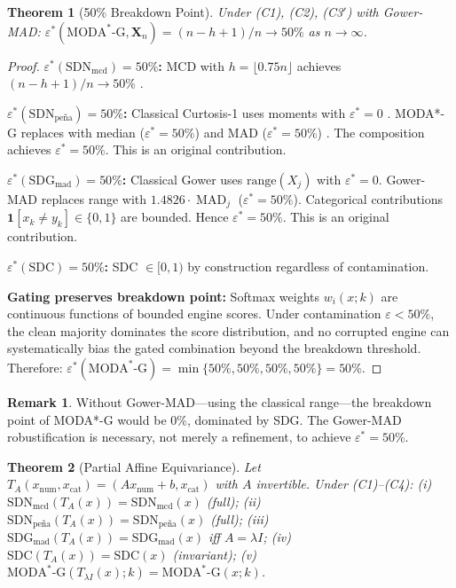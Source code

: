 \documentclass[11pt]{article}
\theoremstyle{plain}
\newtheorem{theorem}{Theorem}
\theoremstyle{definition}
\newtheorem{remark}{Remark}
\DeclareMathOperator{\MAD}{MAD}
\newcommand{\moda}{\text{MODA}^*\text{-G}}
\begin{document}
\begin{theorem}[50\% Breakdown Point]
\label{thm:breakdown}
Under (C1), (C2), (C3$'$) with Gower-MAD:
$\varepsilon^*(\moda, \mathbf{X}_n) =
(n-h+1)/n \to 50\%$ as $n \to \infty$.
\end{theorem}

\begin{proof}
\textbf{$\varepsilon^*(\text{SDN}_\text{mcd}) = 50\%$:}
MCD with $h = \lfloor 0.75n \rfloor$ achieves
$(n-h+1)/n \to 50\%$ \citep{rousseeuw1985}.

\textbf{$\varepsilon^*(\text{SDN}_\text{pe\~{n}a})
= 50\%$:}
Classical Curtosis-1 uses moments with
$\varepsilon^* = 0$ \citep{pena2001}. MODA*-G replaces
with median ($\varepsilon^* = 50\%$) and MAD
($\varepsilon^* = 50\%$) \citep{rousseeuw2018}.
The composition achieves $\varepsilon^* = 50\%$.
This is an original contribution.

\textbf{$\varepsilon^*(\text{SDG}_\text{mad}) = 50\%$:}
Classical Gower uses $\mathrm{range}(X_j)$ with
$\varepsilon^* = 0$. Gower-MAD replaces range with
$1.4826\cdot\MAD_j$ ($\varepsilon^* = 50\%$). Categorical
contributions $\mathbf{1}[x_k \neq y_k] \in \{0,1\}$
are bounded. Hence $\varepsilon^* = 50\%$.
This is an original contribution.

\textbf{$\varepsilon^*(\text{SDC}) = 50\%$:}
SDC $\in [0,1)$ by construction regardless of
contamination.

\textbf{Gating preserves breakdown point:}
Softmax weights $w_i(x;k)$ are continuous functions of
bounded engine scores. Under contamination
$\varepsilon < 50\%$, the clean majority dominates the
score distribution, and no corrupted engine can
systematically bias the gated combination beyond the
breakdown threshold. Therefore:
$\varepsilon^*(\moda) = \min\{50\%, 50\%, 50\%, 50\%\}
= 50\%$.
\end{proof}

\begin{remark}
Without Gower-MAD---using the classical range---the
breakdown point of MODA*-G would be 0\%, dominated by
SDG. The Gower-MAD robustification is necessary, not
merely a refinement, to achieve $\varepsilon^* = 50\%$.
\end{remark}

\begin{theorem}[Partial Affine Equivariance]
\label{thm:equivariance}
Let $T_A(x_\text{num}, x_\text{cat}) =
(Ax_\text{num} + b, x_\text{cat})$ with $A$ invertible.
Under (C1)--(C4):
(i) $\text{SDN}_\text{mcd}(T_A(x)) =
\text{SDN}_\text{mcd}(x)$ (full);
(ii) $\text{SDN}_\text{pe\~{n}a}(T_A(x)) =
\text{SDN}_\text{pe\~{n}a}(x)$ (full);
(iii) $\text{SDG}_\text{mad}(T_A(x)) =
\text{SDG}_\text{mad}(x)$ iff $A = \lambda I$;
(iv) $\text{SDC}(T_A(x)) = \text{SDC}(x)$ (invariant);
(v) $\moda(T_{\lambda I}(x);k) = \moda(x;k)$.
\end{theorem}
\end{document}
